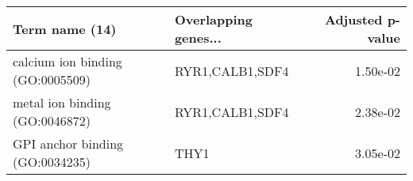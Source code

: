 \begin{tabular}{llr}
\toprule
                  Term name (14) & Overlapping genes... &  Adjusted p-value \\
\midrule
calcium ion binding (GO:0005509) &      RYR1,CALB1,SDF4 &          1.50e-02 \\
  metal ion binding (GO:0046872) &      RYR1,CALB1,SDF4 &          2.38e-02 \\
 GPI anchor binding (GO:0034235) &                 THY1 &          3.05e-02 \\
\bottomrule
\end{tabular}
